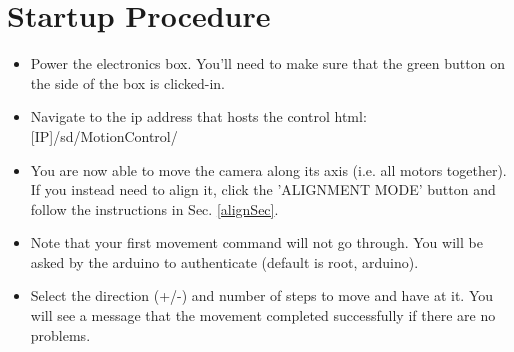 \documentclass[11pt]{article}
\begin{document}
\section{Startup Procedure}

\begin{itemize}
	\item Power the electronics box.  You'll need to make sure that the green button on the side of the box is clicked-in.
	\item Navigate to the ip address that hosts the control html: [IP]/sd/MotionControl/
	\item You are now able to move the camera along its axis (i.e. all motors together).  
		If you instead need to align it, click the 'ALIGNMENT MODE' button and follow the instructions in Sec. \ref{alignSec}.
	\item Note that your first movement command will not go through.  
		You will be asked by the arduino to authenticate (default is root, arduino).
	\item Select the direction (+/-) and number of steps to move and have at it.  
		You will see a message that the movement completed successfully if there are no problems.
\end{itemize}
\end{document}
